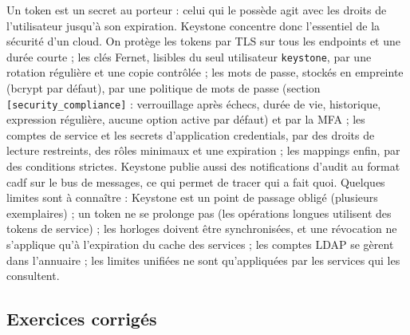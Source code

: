 Un token est un secret au porteur : celui qui le possède agit avec les droits de l'utilisateur jusqu'à son expiration. Keystone
concentre donc l'essentiel de la sécurité d'un cloud. On protège les tokens par TLS sur tous les endpoints et une durée courte ; les clés
Fernet, lisibles du seul utilisateur \texttt{keystone}, par une rotation régulière et une copie contrôlée ; les mots de passe, stockés
en empreinte (bcrypt par défaut), par une politique de mots de passe (section \texttt{[security\_\allowbreak compliance]} : verrouillage
après échecs, durée de vie, historique, expression régulière, aucune option active par défaut) et par la MFA \parencite{keystone-options} ;
les comptes de service et les secrets d'application credentials, par des droits de lecture restreints, des rôles minimaux et une
expiration ; les mappings enfin, par des conditions strictes. Keystone publie aussi des notifications d'audit au format \gls{cadf} sur le
bus de messages, ce qui permet de tracer qui a fait quoi. Quelques limites sont à connaître : Keystone est un point de passage obligé (plusieurs exemplaires) ; un token ne se prolonge pas (les
opérations longues utilisent des tokens de service) ; les horloges doivent être synchronisées, et une révocation ne s'applique qu'à
l'expiration du cache des services ; les comptes LDAP se gèrent dans l'annuaire ; les limites unifiées ne sont qu'appliquées par les
services qui les consultent.


\subsection{Exercices corrigés}\label{sec:ks-exercices}

